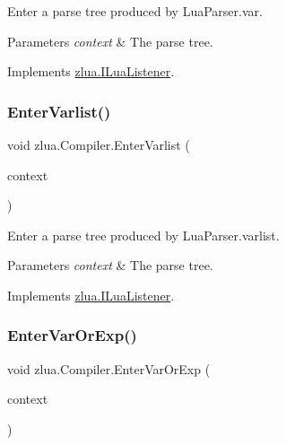 Enter a parse tree produced by Lua\+Parser.\+var. 


\begin{DoxyParams}{Parameters}
{\em context} & The parse tree.\\
\hline
\end{DoxyParams}


Implements \mbox{\hyperlink{interfacezlua_1_1_i_lua_listener_a1feba01e341c07825901bf0a1cd723e3}{zlua.\+I\+Lua\+Listener}}.

\mbox{\label{classzlua_1_1_compiler_ad7137ae6c666bc8dedb3cd24c8b22c49}} 
\subsubsection{\texorpdfstring{Enter\+Varlist()}{EnterVarlist()}}
{\footnotesize\ttfamily void zlua.\+Compiler.\+Enter\+Varlist (\begin{DoxyParamCaption}\item[{\mbox{[}\+Not\+Null\mbox{]} \mbox{\hyperlink{classzlua_1_1_lua_parser_1_1_varlist_context}{Lua\+Parser.\+Varlist\+Context}}}]{context }\end{DoxyParamCaption})}



Enter a parse tree produced by Lua\+Parser.\+varlist. 


\begin{DoxyParams}{Parameters}
{\em context} & The parse tree.\\
\hline
\end{DoxyParams}


Implements \mbox{\hyperlink{interfacezlua_1_1_i_lua_listener_a6803c862c7298f17d74bfcda8f6f159e}{zlua.\+I\+Lua\+Listener}}.

\mbox{\label{classzlua_1_1_compiler_ab7d4a2ccfca5f520e9702eaccab9872b}} 
\subsubsection{\texorpdfstring{Enter\+Var\+Or\+Exp()}{EnterVarOrExp()}}
{\footnotesize\ttfamily void zlua.\+Compiler.\+Enter\+Var\+Or\+Exp (\begin{DoxyParamCaption}\item[{\mbox{[}\+Not\+Null\mbox{]} \mbox{\hyperlink{classzlua_1_1_lua_parser_1_1_var_or_exp_context}{Lua\+Parser.\+Var\+Or\+Exp\+Context}}}]{context }\end{DoxyParamCaption})}



